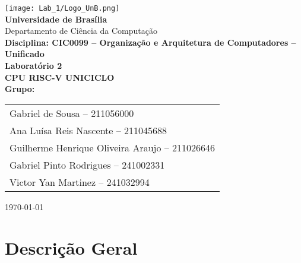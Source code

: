 \documentclass[12pt,a4paper]{article}
\begin{document}
\begin{titlepage}
    \begin{center}
        \vspace*{1cm}
        \texttt{[image: Lab\_1/Logo\_UnB.png]}\\[1cm]

        {\LARGE \textbf{Universidade de Brasília}}\\[4pt]
        {\large Departamento de Ciência da Computação}\\[12pt]
        {\Large \textbf{Disciplina: CIC0099 -- Organização e Arquitetura de Computadores -- Unificado}}\\[20pt]

        {\huge \textbf{Laboratório 2}}\\[6pt]
        {\Large \textbf{CPU RISC-V UNICICLO}}\\[2cm]

        \textbf{Grupo:} \\[4pt]
        \begin{tabular}{l}
            
            Gabriel de Sousa -- 211056000 \\
            Ana Luísa Reis Nascente -- 211045688 \\
            Guilherme Henrique Oliveira Araujo -- 211026646 \\
            Gabriel Pinto Rodrigues -- 241002331 \\
            Victor Yan Martinez -- 241032994 \\
            
        \end{tabular}

        \vfill

        

        \vspace{0.8cm}
        \today
    \end{center}
\end{titlepage}

\tableofcontents
\newpage


\newpage

\section*{Descrição Geral}
\end{document}
